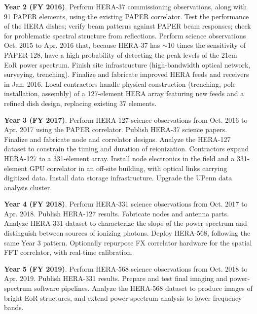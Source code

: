 \documentclass[preprint]{aastex}
\begin{document}
{\bf Year 2 (FY 2016)}.  Perform HERA-37 commissioning observations, 
along with 91 PAPER elements, using the existing PAPER correlator.
Test the performance of the HERA dishes; verify beam
patterns against PAPER beam responses; check for problematic
spectral structure from reflections.  Perform science observations
Oct. 2015 to Apr. 2016 that, because HERA-37 has $\sim$10 times the sensitivity of
PAPER-128, have a high probability of
detecting the peak levels of the 21cm EoR power spectrum.   Finish site
infrastructure (high-bandwidth optical network, surveying, trenching).
Finalize and fabricate improved HERA feeds and receivers in Jan.  2016.
Local contractors handle
physical construction (trenching, pole installation, assembly) of
a 127-element HERA array featuring new feeds and a refined dish design,
replacing existing 37 elements.  

{\bf Year 3 (FY 2017)}.  Perform HERA-127 
science observations from Oct. 2016 to Apr. 2017 using the PAPER correlator.
Publish HERA-37 science papers.   Finalize and fabricate node and correlator designs.
Analyze the HERA-127 dataset to constrain the timing
and duration of reionization.  Contractors expand HERA-127 to a 331-element array.
Install node electronics in the field and a 331-element
GPU correlator in an off-site building,
with optical links carrying digitized data.
Install data storage infrastructure.  Upgrade the UPenn data analysis cluster.

{\bf Year 4 (FY 2018)}.  Perform HERA-331 science observations from 
Oct. 2017 to Apr. 2018.  Publish HERA-127 results.
Fabricate nodes and antenna parts. Analyze HERA-331
dataset to characterize 
the slope of the power spectrum and distinguish between 
sources of ionizing photons.  Deploy HERA-568, following the same
Year 3 pattern.  Optionally repurpose FX correlator hardware 
for the spatial FFT correlator, with real-time calibration.

{\bf Year 5 (FY 2019)}.  Perform HERA-568 science observations from Oct. 2018
to Apr. 2019.  Publish HERA-331 results.  
Prepare and test final imaging and power-spectrum software pipelines. 
Analyze the HERA-568 dataset to produce images of bright EoR structures,
and extend power-spectrum analysis to lower frequency bands.

\vspace{-0.25in}
\end{document}
